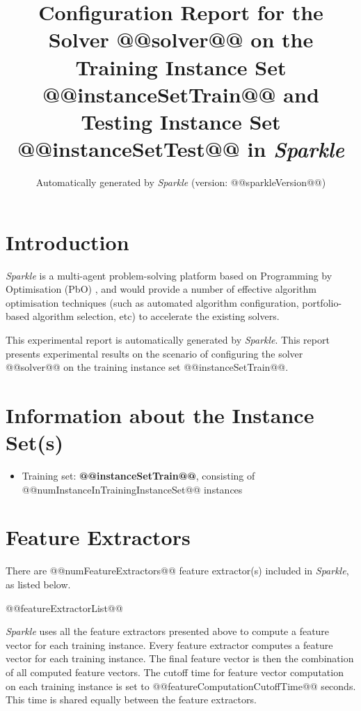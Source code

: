 \documentclass[british]{article}
\title{Configuration Report for the Solver @@solver@@ on the Training Instance Set @@instanceSetTrain@@ \iftest and Testing Instance Set @@instanceSetTest@@ \fi in \emph{Sparkle} }
\author{ Automatically generated by \emph{Sparkle} (version: @@sparkleVersion@@) }
\newif\iftest
\newif\iffeatures
\begin{document}
\maketitle %


\section{Introduction}
\label{sec:Introduction}

\emph{Sparkle} \cite{Hoos15} is a multi-agent problem-solving platform based on Programming by Optimisation (PbO) \cite{Hoos12}, and would provide a number of effective algorithm optimisation techniques (such as automated algorithm configuration, portfolio-based algorithm selection, etc) to accelerate the existing solvers.

This experimental report is automatically generated by \emph{Sparkle}. This report presents experimental results on the scenario of configuring the solver @@solver@@ on the training instance set @@instanceSetTrain@@\iftest~and evaluating it on the testing instance set @@instanceSetTest@@\fi.


\section{Information about the Instance Set(s)}

\begin{itemize}
\item Training set: \textbf{@@instanceSetTrain@@}, consisting of @@numInstanceInTrainingInstanceSet@@ instances
\iftest\item \textbf{@@instanceSetTest@@}, consisting of @@numInstanceInTestingInstanceSet@@ instances\fi
\end{itemize}


\iffeatures
    \section{Feature Extractors}
        There are @@numFeatureExtractors@@ feature extractor(s) included in \emph{Sparkle}, as listed below.

        \begin{enumerate}
        @@featureExtractorList@@
        \end{enumerate}

        \emph{Sparkle} uses all the feature extractors presented above to compute a feature vector for each training instance. Every feature extractor computes a feature vector for each training instance. The final feature vector is then the combination of all computed feature vectors. The cutoff time for feature vector computation on each training instance is set to @@featureComputationCutoffTime@@ seconds. This time is shared equally between the feature extractors.
\end{document}
